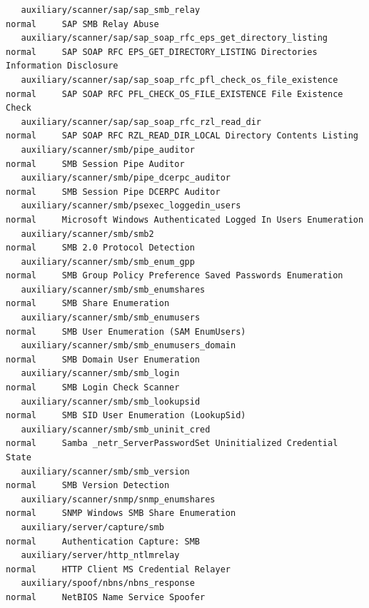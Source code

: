 \documentclass[10pt,a4paper]{report}
\begin{document}
\begin{lstlisting}
   auxiliary/scanner/sap/sap_smb_relay                                              normal     SAP SMB Relay Abuse
   auxiliary/scanner/sap/sap_soap_rfc_eps_get_directory_listing                     normal     SAP SOAP RFC EPS_GET_DIRECTORY_LISTING Directories Information Disclosure
   auxiliary/scanner/sap/sap_soap_rfc_pfl_check_os_file_existence                   normal     SAP SOAP RFC PFL_CHECK_OS_FILE_EXISTENCE File Existence Check
   auxiliary/scanner/sap/sap_soap_rfc_rzl_read_dir                                  normal     SAP SOAP RFC RZL_READ_DIR_LOCAL Directory Contents Listing
   auxiliary/scanner/smb/pipe_auditor                                               normal     SMB Session Pipe Auditor
   auxiliary/scanner/smb/pipe_dcerpc_auditor                                        normal     SMB Session Pipe DCERPC Auditor
   auxiliary/scanner/smb/psexec_loggedin_users                                      normal     Microsoft Windows Authenticated Logged In Users Enumeration
   auxiliary/scanner/smb/smb2                                                       normal     SMB 2.0 Protocol Detection
   auxiliary/scanner/smb/smb_enum_gpp                                               normal     SMB Group Policy Preference Saved Passwords Enumeration
   auxiliary/scanner/smb/smb_enumshares                                             normal     SMB Share Enumeration
   auxiliary/scanner/smb/smb_enumusers                                              normal     SMB User Enumeration (SAM EnumUsers)
   auxiliary/scanner/smb/smb_enumusers_domain                                       normal     SMB Domain User Enumeration
   auxiliary/scanner/smb/smb_login                                                  normal     SMB Login Check Scanner
   auxiliary/scanner/smb/smb_lookupsid                                              normal     SMB SID User Enumeration (LookupSid)
   auxiliary/scanner/smb/smb_uninit_cred                                            normal     Samba _netr_ServerPasswordSet Uninitialized Credential State
   auxiliary/scanner/smb/smb_version                                                normal     SMB Version Detection
   auxiliary/scanner/snmp/snmp_enumshares                                           normal     SNMP Windows SMB Share Enumeration
   auxiliary/server/capture/smb                                                     normal     Authentication Capture: SMB
   auxiliary/server/http_ntlmrelay                                                  normal     HTTP Client MS Credential Relayer
   auxiliary/spoof/nbns/nbns_response                                               normal     NetBIOS Name Service Spoofer

\end{lstlisting}
\end{document}
